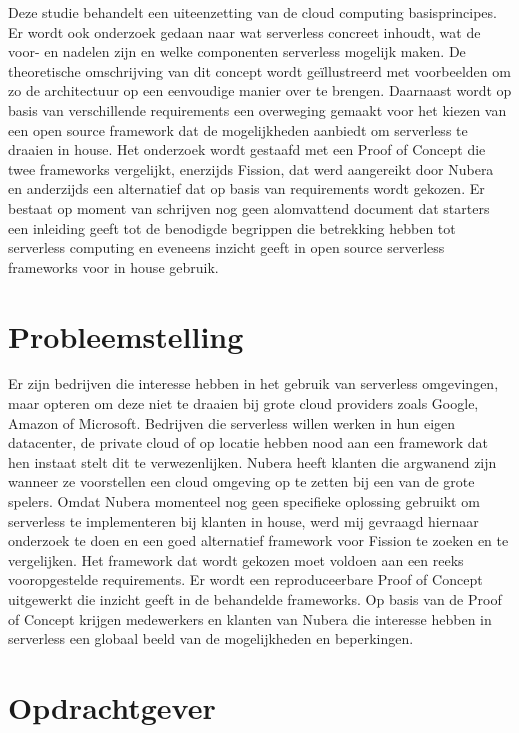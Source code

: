 Deze studie behandelt een uiteenzetting van de cloud computing basisprincipes. Er wordt ook onderzoek gedaan naar wat serverless concreet inhoudt, wat de voor- en nadelen zijn en welke componenten serverless mogelijk maken. De theoretische omschrijving van dit concept wordt geïllustreerd met voorbeelden om zo de architectuur op een eenvoudige manier over te brengen. Daarnaast wordt op basis van verschillende requirements een overweging gemaakt voor het kiezen van een open source framework dat de mogelijkheden aanbiedt om serverless te draaien in house. Het onderzoek wordt gestaafd met een Proof of Concept die twee frameworks vergelijkt, enerzijds Fission, dat werd aangereikt door Nubera en anderzijds een alternatief dat op basis van requirements wordt gekozen. Er bestaat op moment van schrijven nog geen alomvattend document dat starters een inleiding geeft tot de benodigde begrippen die betrekking hebben tot serverless computing en eveneens inzicht geeft in open source serverless frameworks voor in house gebruik.

\section{Probleemstelling}
\label{sec:probleemstelling}

Er zijn bedrijven die interesse hebben in het gebruik van serverless omgevingen, maar opteren om deze niet te draaien bij grote cloud providers zoals Google, Amazon of Microsoft. Bedrijven die serverless willen werken in hun eigen datacenter, de private cloud of op locatie hebben nood aan een framework dat hen instaat stelt dit te verwezenlijken. Nubera heeft klanten die argwanend zijn wanneer ze voorstellen een cloud omgeving op te zetten bij een van de grote spelers. Omdat Nubera momenteel nog geen specifieke oplossing gebruikt om serverless te implementeren bij klanten in house, werd mij gevraagd hiernaar onderzoek te doen en een goed alternatief framework voor Fission te zoeken en te vergelijken. Het framework dat wordt gekozen moet voldoen aan een reeks vooropgestelde requirements. Er wordt een reproduceerbare Proof of Concept uitgewerkt die inzicht geeft in de behandelde frameworks. Op basis van de Proof of Concept krijgen medewerkers en klanten van Nubera die interesse hebben in serverless een globaal beeld van de mogelijkheden en beperkingen.

\section{Opdrachtgever}
\label{sec:opdrachtgever}

